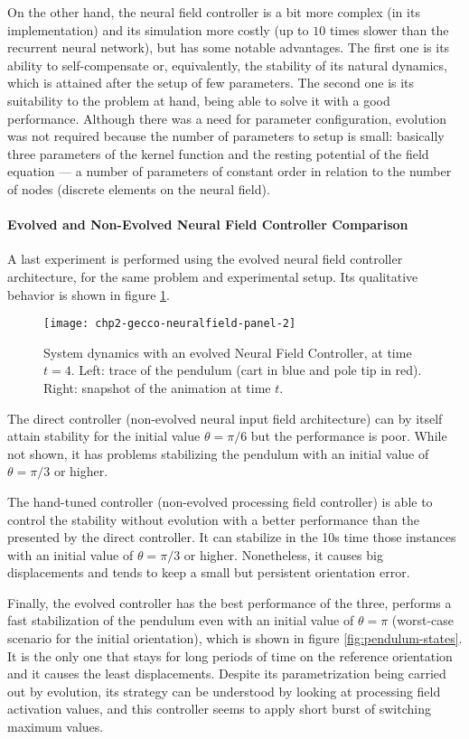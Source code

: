 On the other hand, the neural field controller is a bit more complex
(in its implementation) and its simulation more costly (up to $10$
times slower than the recurrent neural network), but has some notable
advantages. The first one is its ability to self-compensate or,
equivalently, the stability of its natural dynamics, which is attained
after the setup of few parameters. The second one is its suitability
to the problem at hand, being able to solve it with a good
performance. Although there was a need for parameter configuration,
evolution was not required because the number of parameters to setup
is small: basically three parameters of the kernel function and the
resting potential of the field equation --- a number of parameters of
constant order in relation to the number of nodes (discrete elements
on the neural field).


\paragraph{Evolved and Non-Evolved Neural Field Controller Comparison}
A last experiment is performed using the evolved neural field
controller architecture, for the same problem and experimental
setup. Its qualitative behavior is shown in figure
\ref{fig:chp2-evonf-capture}.

\begin{figure}[h]
  \centering
  \texttt{[image: chp2-gecco-neuralfield-panel-2]}
  \caption{System dynamics with an evolved Neural Field Controller, at
    time $t=4$. Left: trace of the pendulum (cart in blue and pole tip
    in red). Right: snapshot of the animation at time $t$.}
  \label{fig:chp2-evonf-capture}
\end{figure}

The direct controller (non-evolved neural input field architecture)
can by itself attain stability for the initial value $\theta=\pi/6$
but the performance is poor. While not shown, it has problems
stabilizing the pendulum with an initial value of $\theta=\pi/3$ or
higher.

The hand-tuned controller (non-evolved processing field controller) is
able to control the stability without evolution with a better
performance than the presented by the direct controller. It can
stabilize in the 10s time those instances with an initial value of
$\theta=\pi/3$ or higher. Nonetheless, it causes big displacements and
tends to keep a small but persistent orientation error.

Finally, the evolved controller has the best performance of the three,
performs a fast stabilization of the pendulum even with an initial
value of $\theta=\pi$ (worst-case scenario for the initial
orientation), which is shown in figure \ref{fig:pendulum-states}. It is the
only one that stays for long periods of time on the reference
orientation and it causes the least displacements. Despite its
parametrization being carried out by evolution, its strategy can be
understood by looking at processing field activation values, and this
controller seems to apply short burst of switching maximum values.

